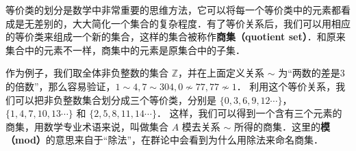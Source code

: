 等价类的划分是数学中非常重要的思维方法，它可以将每一个等价类中的元素都看成是无差别的，大大简化一个集合的复杂程度．有了等价关系后，我们可以用相应的等价类来组成一个新的集合，这样的集合被称作\textbf{商集（quotient set）}．和原来集合中的元素不一样，商集中的元素是原集合中的子集．

作为例子，我们取全体非负整数的集合 $\mathbb{Z}$，并在上面定义关系 $\sim$ 为“两数的差是3的倍数”，那么容易验证，$1\sim4, 7\sim304, 0\not\sim 77, 77\not\sim 1$． 利用这个等价关系，我们可以把非负整数集合划分成三个等价类，分别是 $\{0, 3, 6, 9, 12\cdots \}$，$\{1, 4, 7, 10, 13\cdots\}$ 和 $\{2, 5, 8, 11, 14\cdots\}$． 这样，我们可以得到一个含有三个元素的商集，用数学专业术语来说，叫做集合 $A$ 模去关系 $\sim$ 所得的商集．这里的\textbf{模（mod）}的意思来自于“除法”，在群论中会看到为什么用除法来命名商集．